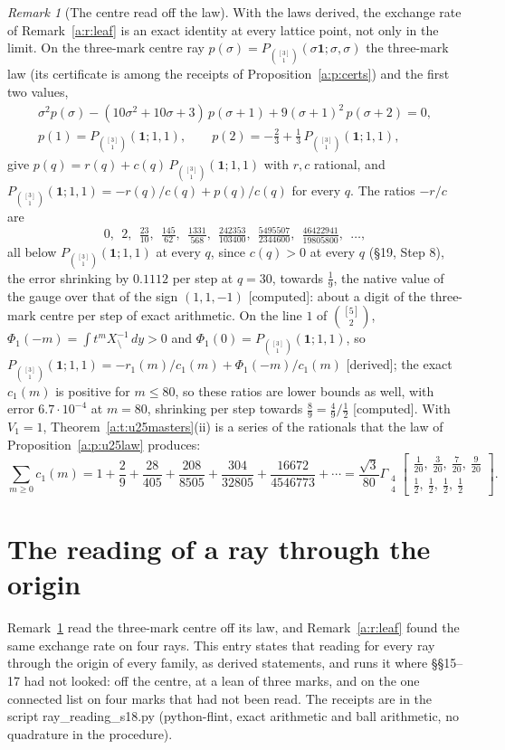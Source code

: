 \documentclass[11pt]{article}
\newcommand{\one}{\mathbf 1}
\newcommand{\Gst}[4]{\Gamma_{\substack{#1\\#2}}\!\begin{bmatrix}#3\\#4\end{bmatrix}}
\newcommand{\Pth}{P_{\binom{[3]}1}(\one;1,1)}
\theoremstyle{plain}
\theoremstyle{definition}
\theoremstyle{remark}
\newtheorem{remark}[proposition]{Remark}
\renewcommand{\thesection}{15}
\renewcommand{\theproposition}{15.\arabic{proposition}}
\newcommand{\derived}{\textup{[derived]}}
\newcommand{\computed}{\textup{[computed]}}
\begin{document}
\begin{remark}[The centre read off the law]\label{a:r:paper}
With the laws derived, the exchange rate of Remark~\ref{a:r:leaf} is an exact identity at every lattice point, not only in the limit. On the three-mark centre ray $p(\sigma)=P_{\binom{[3]}1}(\sigma\one;\sigma,\sigma)$ the three-mark law (its certificate is among the receipts of Proposition~\ref{a:p:certs}) and the first two values,
\begin{gather*}
\sigma^2p(\sigma)-(10\sigma^2+10\sigma+3)\,p(\sigma+1)+9(\sigma+1)^2\,p(\sigma+2)=0,\\
p(1)=\Pth,\qquad p(2)=-\tfrac23+\tfrac13\,\Pth,
\end{gather*}
give $p(q)=r(q)+c(q)\,\Pth$ with $r,c$ rational, and $\Pth=-r(q)/c(q)+p(q)/c(q)$ for every $q$. The ratios $-r/c$ are
\[
0,\ \ 2,\ \ \tfrac{23}{10},\ \ \tfrac{145}{62},\ \ \tfrac{1331}{568},\ \ \tfrac{242353}{103400},\ \ \tfrac{5495507}{2344600},\ \ \tfrac{46422941}{19805800},\ \ \dots,
\]
all below $\Pth$ at every $q$, since $c(q)>0$ at every $q$ (\S19, Step 8), the error shrinking by $0.1112$ per step at $q=30$, towards $\frac19$, the native value of the gauge over that of the sign $(1,1,-1)$ \computed: about a digit of the three-mark centre per step of exact arithmetic. On the line $1$ of $\binom{[5]}2$, $\Phi_1(-m)=\int t^m X_{\setminus}^{-1}\,dy>0$ and $\Phi_1(0)=\Pth$, so $\Pth=-r_1(m)/c_1(m)+\Phi_1(-m)/c_1(m)$ \derived; the exact $c_1(m)$ is positive for $m\le80$, so these ratios are lower bounds as well, with error $6.7\cdot10^{-4}$ at $m=80$, shrinking per step towards $\frac89=\frac49\big/\frac12$ \computed. With $V_1=1$, Theorem~\ref{a:t:u25masters}(ii) is a series of the rationals that the law of Proposition~\ref{a:p:u25law} produces:
\[
\sum_{m\ge0}c_1(m)=1+\frac29+\frac{28}{405}+\frac{208}{8505}+\frac{304}{32805}+\frac{16672}{4546773}+\cdots=\frac{\sqrt3}{80}\Gst44{\tfrac1{20},\ \tfrac3{20},\ \tfrac7{20},\ \tfrac9{20}}{\tfrac12,\ \tfrac12,\ \tfrac12,\ \tfrac12}.
\]
\end{remark}

\renewcommand{\thesection}{18}
\setcounter{proposition}{0}
\renewcommand{\theproposition}{18.\arabic{proposition}}

\section{The reading of a ray through the origin}

Remark~\ref{a:r:paper} read the three-mark centre off its law, and Remark~\ref{a:r:leaf} found the same exchange rate on four rays. This entry states that reading for every ray through the origin of every family, as derived statements, and runs it where \S\S15--17 had not looked: off the centre, at a lean of three marks, and on the one connected list on four marks that had not been read. The receipts are in the script ray\_reading\_s18.py (python-flint, exact arithmetic and ball arithmetic, no quadrature in the procedure).
\end{document}
